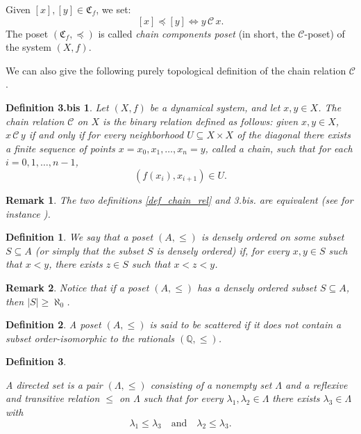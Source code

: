 \documentclass[pdflatex,sn-mathphys-num]{sn-jnl}
\theoremstyle{thmstyleone}%
\theoremstyle{thmstyletwo}%
\newtheorem{rem}{Remark}%
\theoremstyle{thmstylethree}%
\newtheorem{defi}{Definition}%
\newtheorem*{defibis}{Definition 3.bis}
\begin{document}
\noindent Given $[x],[y]\in \mathfrak{C}_f$, we set:
\[
[x]\preceq [y]\iff y\,\mathcal{C}\,x.
\]
The poset $(\mathfrak{C}_f,\preceq)$ is called \emph{chain components poset} (in short, the $\mathcal{C}$-poset) of the system $(X,f)$.

\noindent We can also give the following purely topological definition of the chain relation $\mathcal{C}$.

\begin{defibis}
Let \((X, f)\) be a dynamical system, and let \(x, y \in X\). The chain relation $\mathcal{C}$ on $X$ is the binary relation defined as follows: given $x, y \in X$, $x\,\mathcal{C}\, y$ if and only if for every neighborhood $U\subseteq X\times X$ of the diagonal there exists a finite sequence of points \(x = x_0, x_1, \ldots, x_n = y\), called a chain, such that for each \(i = 0, 1, \ldots, n-1\),  
\[ 
(f(x_i), x_{i+1}) \in U. 
\]
\end{defibis}

\begin{rem}
The two definitions \ref{def_chain_rel} and 3.\textit{bis}. are equivalent (see for instance \cite[p.~47]{kurka}).
\end{rem}

\begin{defi}\label{def_dens_ord_}
    We say that a poset $(A,\le)$ is \emph{densely ordered} on some subset $S\subseteq A$ (or simply that the subset $S$ is densely ordered) if, for every $x,y\in S$ such that $x<y$, there exists $z\in S$ such that $x<z<y$.
\end{defi}
\begin{rem}
    Notice that if a poset $(A,\le)$ has a densely ordered subset $S\subseteq A$, then $|S|\ge \aleph_0$.
\end{rem}

\begin{defi}\label{def_scattered}
A poset $(A,\leq)$ is said to be \emph{scattered} if it does not contain a subset order-isomorphic to the rationals $(\mathbb{Q}, \leq)$.  
\end{defi}

\begin{defi}\label{def_directedset}

    A \emph{directed set} is a pair $(\Lambda,\leq)$ consisting of a nonempty set
$\Lambda$ and a reflexive and transitive relation $\leq$ on $\Lambda$ such that
for every $\lambda_1,\lambda_2 \in \Lambda$ there exists $\lambda_3 \in \Lambda$
with
$$\lambda_1 \leq \lambda_3 \quad \text{and} \quad \lambda_2 \leq \lambda_3.$$
    
\end{defi}
\end{document}
